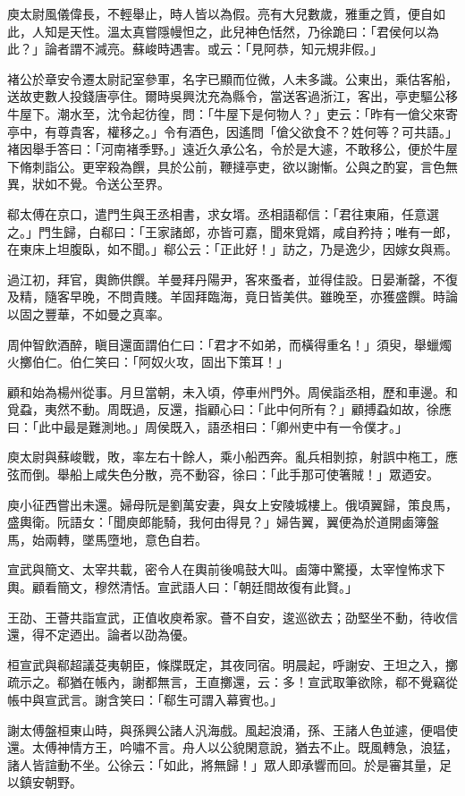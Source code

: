 庾太尉風儀偉長，不輕舉止，時人皆以為假。亮有大兒數歲，雅重之質，便自如此，人知是天性。溫太真嘗隱幔怛之，此兒神色恬然，乃徐跪曰：「君侯何以為此？」論者謂不減亮。蘇峻時遇害。或云：「見阿恭，知元規非假。」

褚公於章安令遷太尉記室參軍，名字已顯而位微，人未多識。公東出，乘估客船，送故吏數人投錢唐亭住。爾時吳興沈充為縣令，當送客過浙江，客出，亭吏驅公移牛屋下。潮水至，沈令起彷徨，問：「牛屋下是何物人？」吏云：「昨有一傖父來寄亭中，有尊貴客，權移之。」令有酒色，因遙問「傖父欲食不？姓何等？可共語。」褚因舉手答曰：「河南褚季野。」遠近久承公名，令於是大遽，不敢移公，便於牛屋下脩刺詣公。更宰殺為饌，具於公前，鞭撻亭吏，欲以謝慚。公與之酌宴，言色無異，狀如不覺。令送公至界。

郗太傅在京口，遣門生與王丞相書，求女壻。丞相語郗信：「君往東廂，任意選之。」門生歸，白郗曰：「王家諸郎，亦皆可嘉，聞來覓婿，咸自矜持；唯有一郎，在東床上坦腹臥，如不聞。」郗公云：「正此好！」訪之，乃是逸少，因嫁女與焉。

過江初，拜官，輿飾供饌。羊曼拜丹陽尹，客來蚤者，並得佳設。日晏漸罄，不復及精，隨客早晚，不問貴賤。羊固拜臨海，竟日皆美供。雖晚至，亦獲盛饌。時論以固之豐華，不如曼之真率。

周仲智飲酒醉，瞋目還面謂伯仁曰：「君才不如弟，而橫得重名！」須臾，舉蠟燭火擲伯仁。伯仁笑曰：「阿奴火攻，固出下策耳！」

顧和始為楊州從事。月旦當朝，未入頃，停車州門外。周侯詣丞相，歷和車邊。和覓蝨，夷然不動。周既過，反還，指顧心曰：「此中何所有？」顧搏蝨如故，徐應曰：「此中最是難測地。」周侯既入，語丞相曰：「卿州吏中有一令僕才。」

庾太尉與蘇峻戰，敗，率左右十餘人，乘小船西奔。亂兵相剝掠，射誤中柂工，應弦而倒。舉船上咸失色分散，亮不動容，徐曰：「此手那可使箸賊！」眾迺安。

庾小征西嘗出未還。婦母阮是劉萬安妻，與女上安陵城樓上。俄頃翼歸，策良馬，盛輿衛。阮語女：「聞庾郎能騎，我何由得見？」婦告翼，翼便為於道開鹵簿盤馬，始兩轉，墜馬墮地，意色自若。

宣武與簡文、太宰共載，密令人在輿前後鳴鼓大叫。鹵簿中驚擾，太宰惶怖求下輿。顧看簡文，穆然清恬。宣武語人曰：「朝廷間故復有此賢。」

王劭、王薈共詣宣武，正值收庾希家。薈不自安，逡巡欲去；劭堅坐不動，待收信還，得不定迺出。論者以劭為優。

桓宣武與郗超議芟夷朝臣，條牒既定，其夜同宿。明晨起，呼謝安、王坦之入，擲疏示之。郗猶在帳內，謝都無言，王直擲還，云：多！宣武取筆欲除，郗不覺竊從帳中與宣武言。謝含笑曰：「郗生可謂入幕賓也。」

謝太傅盤桓東山時，與孫興公諸人汎海戲。風起浪涌，孫、王諸人色並遽，便唱使還。太傅神情方王，吟嘯不言。舟人以公貌閑意說，猶去不止。既風轉急，浪猛，諸人皆諠動不坐。公徐云：「如此，將無歸！」眾人即承響而回。於是審其量，足以鎮安朝野。

